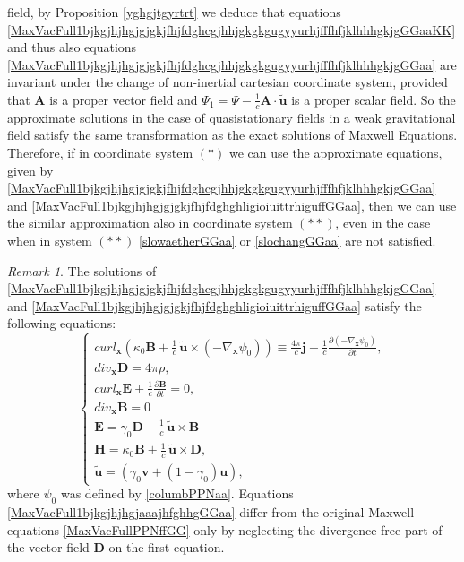\documentclass{article}
\theoremstyle{definition}
\theoremstyle{remark}
\newtheorem{remark}{Remark}[section]
\renewcommand{\vec}[1]{\mathbf{#1}}
\newcommand{\er}{\eqref}
\newcommand{\er}{\eqref}
\newtheorem{remark}{Remark}
\begin{document}
field, by Proposition \ref{yghgjtgyrtrt} we deduce that equations
\er{MaxVacFull1bjkgjhjhgjgjgkjfhjfdghcgjhhjgkgkgugyyurhjfffhfjklhhhgkjgGGaaKK}
and thus also equations
\er{MaxVacFull1bjkgjhjhgjgjgkjfhjfdghcgjhhjgkgkgugyyurhjfffhfjklhhhgkjgGGaa}
are invariant under the change of non-inertial cartesian coordinate
system, provided that $\vec A$ is a proper vector field and
$\Psi_1=\Psi-\frac{1}{c}\vec A\cdot\vec {\tilde u}$ is a proper
scalar field. So the approximate solutions in the case of
quasistationary fields in a weak gravitational field satisfy the
same transformation as the exact solutions of Maxwell Equations.
Therefore, if in coordinate system $(*)$ we can use the approximate
equations, given by
\er{MaxVacFull1bjkgjhjhgjgjgkjfhjfdghcgjhhjgkgkgugyyurhjfffhfjklhhhgkjgGGaa}
and \er{MaxVacFull1bjkgjhjhgjgjgkjfhjfdghghligioiuittrhiguffGGaa},
then we can use the similar approximation
also in coordinate system $(**)$, even in the case when in system
$(**)$ \er{slowaetherGGaa} or \er{slochangGGaa} are not satisfied.
\begin{remark}
The solutions of
\er{MaxVacFull1bjkgjhjhgjgjgkjfhjfdghcgjhhjgkgkgugyyurhjfffhfjklhhhgkjgGGaa}
and \er{MaxVacFull1bjkgjhjhgjgjgkjfhjfdghghligioiuittrhiguffGGaa}
satisfy the following equations:
\begin{equation}\label{MaxVacFull1bjkgjhjhgjaaajhfghhgGGaa}
\begin{cases}
curl_{\vec x} \left(\kappa_0\vec B+\frac{1}{c}\,\vec {\tilde
u}\times \left(- \nabla_{\vec x}\psi_0\right)\right)\equiv
\frac{4\pi}{c}\vec j+\frac{1}{c}\frac{\partial (-
\nabla_{\vec x}\psi_0)}{\partial t},\\
div_{\vec x} \vec D=4\pi\rho,\\
curl_{\vec x} \vec E+\frac{1}{c}\frac{\partial \vec B}{\partial t}=0,\\
div_{\vec x} \vec B=0\\
\vec E=\gamma_0\vec D-\frac{1}{c}\,\vec {\tilde u}\times \vec B\\
\vec H=\kappa_0\vec B+\frac{1}{c}\,\vec {\tilde u}\times \vec D,\\
\vec {\tilde u}=\left(\gamma_0\vec v+(1-\gamma_0)\vec u\right),
\end{cases}
\end{equation}
where $\psi_0$ was defined by \er{columbPPNaa}. Equations
\er{MaxVacFull1bjkgjhjhgjaaajhfghhgGGaa} differ from the original
Maxwell equations \er{MaxVacFullPPNffGG} only by neglecting the
divergence-free part of the vector field $\vec D$ on the first
equation.
\end{remark}
\end{document}
